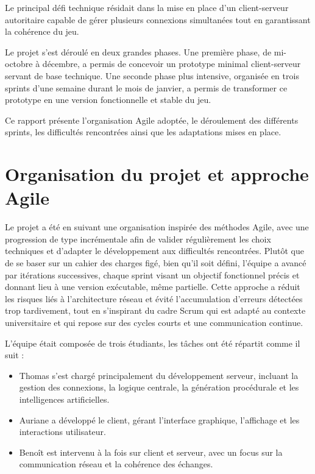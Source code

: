 \documentclass[a4paper, 11pt]{article}
\begin{document}
Le principal défi technique résidait dans la mise en place d’un client-serveur autoritaire capable de gérer plusieurs connexions simultanées tout en garantissant la cohérence du jeu. 

Le projet s’est déroulé en deux grandes phases. Une première phase, de mi-octobre à décembre, a permis de concevoir un prototype minimal client-serveur servant de base technique. 
Une seconde phase plus intensive, organisée en trois sprints d’une semaine durant le mois de janvier, a permis de transformer ce prototype en une version fonctionnelle et stable du jeu.

Ce rapport présente l’organisation Agile adoptée, le déroulement des différents sprints, les difficultés rencontrées ainsi que les adaptations mises en place.

\section{Organisation du projet et approche Agile}

Le projet a été en suivant une organisation inspirée des méthodes Agile, avec une progression de type incrémentale afin de valider régulièrement les choix techniques et d’adapter le développement aux difficultés rencontrées. Plutôt que de se baser sur un cahier des charges figé, bien qu'il soit défini, l’équipe a avancé par itérations successives, chaque sprint visant un objectif fonctionnel précis et donnant lieu à une version exécutable, même partielle. Cette approche a réduit les risques liés à l’architecture réseau et évité l’accumulation d’erreurs détectées trop tardivement, tout en s’inspirant du cadre Scrum qui est adapté au contexte universitaire et qui repose sur des cycles courts et une communication continue.

L’équipe était composée de trois étudiants, les tâches ont été répartit  comme il suit :\\
\begin{itemize}
  \item Thomas s’est chargé principalement du développement serveur, incluant la gestion des connexions, la logique centrale, la génération procédurale et les intelligences artificielles.
  \item Auriane a développé le client, gérant l’interface graphique, l’affichage et les interactions utilisateur.
  \item Benoît est intervenu à la fois sur client et serveur, avec un focus sur la communication réseau et la cohérence des échanges.\\
\end{itemize}
\end{document}
